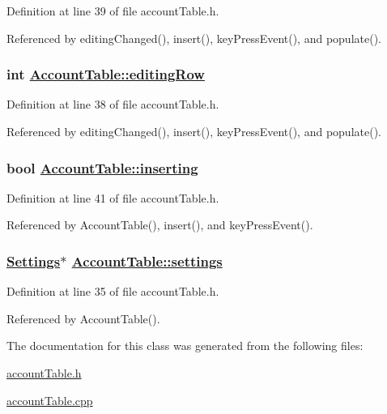 Definition at line 39 of file account\-Table.h.

Referenced by editing\-Changed(), insert(), key\-Press\-Event(), and populate().\hypertarget{classAccountTable_r3}{
\subsubsection[editingRow]{\setlength{\rightskip}{0pt plus 5cm}int \hyperlink{classAccountTable_r3}{Account\-Table::editing\-Row}}}
\label{classAccountTable_r3}


Definition at line 38 of file account\-Table.h.

Referenced by editing\-Changed(), insert(), key\-Press\-Event(), and populate().\hypertarget{classAccountTable_r5}{
\subsubsection[inserting]{\setlength{\rightskip}{0pt plus 5cm}bool \hyperlink{classAccountTable_r5}{Account\-Table::inserting}}}
\label{classAccountTable_r5}


Definition at line 41 of file account\-Table.h.

Referenced by Account\-Table(), insert(), and key\-Press\-Event().\hypertarget{classAccountTable_r1}{
\subsubsection[settings]{\setlength{\rightskip}{0pt plus 5cm}\hyperlink{classSettings}{Settings}$\ast$ \hyperlink{classAccountTable_r1}{Account\-Table::settings}}}
\label{classAccountTable_r1}


Definition at line 35 of file account\-Table.h.

Referenced by Account\-Table().

The documentation for this class was generated from the following files:\begin{CompactItemize}
\item 
\hyperlink{accountTable_8h}{account\-Table.h}\item 
\hyperlink{accountTable_8cpp}{account\-Table.cpp}\end{CompactItemize}
